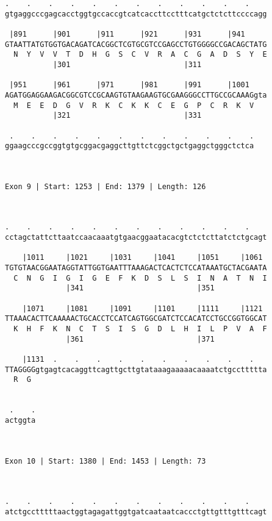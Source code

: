 \documentclass{article}
\begin{document}
{\begin{Verbatim}
.    .    .    .    .    .    .    .    .    .    .    .    
gtgaggcccgagcacctggtgccaccgtcatcaccttcctttcatgctctcttccccagg
                                                            
 |891      |901      |911      |921      |931      |941     
GTAATTATGTGGTGACAGATCACGGCTCGTGCGTCCGAGCCTGTGGGGCCGACAGCTATG
  N  Y  V  V  T  D  H  G  S  C  V  R  A  C  G  A  D  S  Y  E
           |301                          |311               
  
 |951      |961      |971      |981      |991      |1001    
AGATGGAGGAAGACGGCGTCCGCAAGTGTAAGAAGTGCGAAGGGCCTTGCCGCAAAGgta
  M  E  E  D  G  V  R  K  C  K  K  C  E  G  P  C  R  K  V   
           |321                          |331               
  
 .    .    .    .    .    .    .    .    .    .    .    .
ggaagcccgccggtgtgcggacgaggcttgttctcggctgctgaggctgggctctca
                                                         
                                                         
 
Exon 9 | Start: 1253 | End: 1379 | Length: 126



.    .    .    .    .    .    .    .    .    .    .    .    
cctagctattcttaatccaacaaatgtgaacggaatacacgtctctcttatctctgcagt
                                                            
    |1011     |1021     |1031     |1041     |1051     |1061 
TGTGTAACGGAATAGGTATTGGTGAATTTAAAGACTCACTCTCCATAAATGCTACGAATA
  C  N  G  I  G  I  G  E  F  K  D  S  L  S  I  N  A  T  N  I
              |341                          |351            
  
    |1071     |1081     |1091     |1101     |1111     |1121 
TTAAACACTTCAAAAACTGCACCTCCATCAGTGGCGATCTCCACATCCTGCCGGTGGCAT
  K  H  F  K  N  C  T  S  I  S  G  D  L  H  I  L  P  V  A  F
              |361                          |371            
  
    |1131  .    .    .    .    .    .    .    .    .    .   
TTAGGGGgtgagtcacaggttcagttgcttgtataaagaaaaacaaaatctgccttttta
  R  G                                                      
                                                            
  
 .    .
actggta
       
       
 
Exon 10 | Start: 1380 | End: 1453 | Length: 73



.    .    .    .    .    .    .    .    .    .    .    .    
atctgcctttttaactggtagagattggtgatcaataatcaccctgttgtttgtttcagt
                                                            

\end{Verbatim}}
\end{document}
